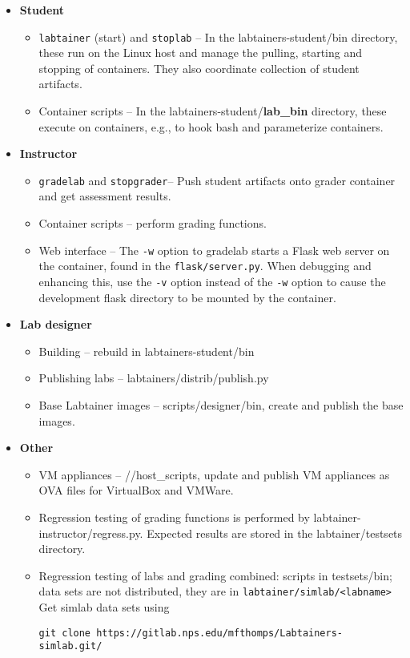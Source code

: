 \documentclass[12pt]{article}
\begin{document}
\begin{itemize}
	\item {\bf Student} \begin{itemize}
\item {\tt labtainer} (start) and {\tt stoplab} -- In the labtainers-student/bin directory, these run on the 
Linux host and manage the pulling, starting and stopping of containers.  They also coordinate
collection of student artifacts.
\item Container scripts -- In the labtainers-student/{\bf lab\_bin} directory, these execute on
containers, e.g., to hook bash and parameterize containers.
	\end{itemize}

	\item {\bf Instructor} \begin{itemize}
\item {\tt gradelab} and {\tt stopgrader}-- Push student artifacts onto grader container and get assessment results.
\item Container scripts -- perform grading functions.
\item Web interface -- The {\tt -w} option to gradelab starts a Flask web server on the container, found in the
{\tt flask/server.py}.  When debugging and enhancing this, use the {\tt -v} option instead of the {\tt -w} option to
cause the development flask directory to be mounted by the container.
	\end{itemize}

	\item {\bf Lab designer} \begin{itemize}
\item Building -- rebuild in labtainers-student/bin 
\item Publishing labs -- labtainers/distrib/publish.py
\item Base Labtainer images -- scripts/designer/bin, create and publish the base images.
	\end{itemize}	

	\item {\bf Other} \begin{itemize}
\item VM appliances -- //host\_scripts, update and publish VM appliances as OVA files for 
VirtualBox and VMWare.
\item Regression testing of grading functions is performed by labtainer-instructor/regress.py.
Expected results are stored in the labtainer/testsets directory.
\item Regression testing of labs and grading combined: scripts in testsets/bin; data sets
are not distributed, they are in {\tt labtainer/simlab/<labname>}  Get simlab data sets using
\begin{verbatim}
git clone https://gitlab.nps.edu/mfthomps/Labtainers-simlab.git/
\end{verbatim}

       \end{itemize}

\end{itemize}
\end{document}
